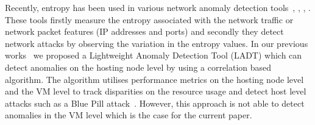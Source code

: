 Recently, entropy has been used in various network anomaly detection tools~\cite{entorpy_based_detection_1:2005}, \cite{entorpy_based_detection_5:2014}, \cite{entorpy_based_detection_3:2017}, \cite{entorpy_based_detection_4:2017}. These tools firstly measure the entropy associated with the network traffic or network packet features (IP addresses and ports) and secondly they detect network attacks by observing the variation in the entropy values.
In our previous works~\cite{ladt:2015, ls-ladt:2016} we proposed a Lightweight Anomaly Detection Tool (LADT) which can detect anomalies on the hosting node level by using a correlation based algorithm. The algorithm utilises performance metrics on the hosting node level and the VM level to track disparities on the resource usage and detect host level attacks such as a Blue Pill attack~\cite{bluepill:2006}. However, this approach is not able to detect anomalies in the VM level which is the case for the current paper.

